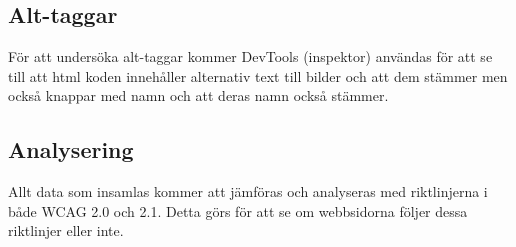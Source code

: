 \documentclass[11p]{article}
\begin{document}
    \subsection{Alt-taggar}
    För att undersöka alt-taggar kommer DevTools (inspektor) användas för att se till att html koden innehåller alternativ text till bilder och att dem stämmer men också knappar med namn och att deras namn också stämmer.

    \subsection{Analysering}

    Allt data som insamlas kommer att jämföras och analyseras med riktlinjerna i både WCAG 2.0 och 2.1.
    Detta görs för att se om webbsidorna följer dessa riktlinjer eller inte.


    \printbibliography
\end{document}
